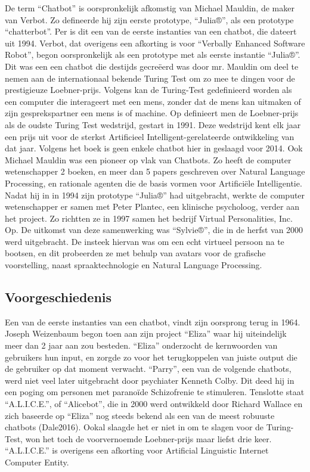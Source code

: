 De term “Chatbot” is oorspronkelijk afkomstig van Michael Mauldin, de maker van Verbot. Zo defineerde hij zijn eerste prototype, “Julia®”, als een prototype “chatterbot”. Per \textcite{Vlahos2019} is dit een van de eerste instanties van een chatbot, die dateert uit 1994. Verbot, dat overigens een afkorting is voor “Verbally Enhanced Software Robot”, begon oorspronkelijk als een prototype met als eerste instantie “Julia®”. Dit was een een chatbot die destijds gecreëerd was door mr. Mauldin om deel te nemen aan de internationaal bekende Turing Test om zo mee te dingen voor de prestigieuze Loebner-prijs. Volgens \textcite{Moor2012} kan de Turing-Test gedefinieerd worden als een computer die interageert met een mens, zonder dat de mens kan uitmaken of zijn gesprekspartner een mens is of machine. Op \textcite{O'Neill2016} definieert men de Loebner-prijs als de oudste Turing Test wedstrijd, gestart in 1991. Deze wedstrijd kent elk jaar een prijs uit voor de sterkst Artificieel Intelligent-gerelateerde ontwikkeling van dat jaar. Volgens het boek is geen enkele chatbot hier in geslaagd voor 2014. 
Ook Michael Mauldin was een pioneer op vlak van Chatbots. Zo heeft de computer wetenschapper 2 boeken, en meer dan 5 papers geschreven over Natural Language Processing, en rationale agenten die de basis vormen voor Artificiële Intelligentie. Nadat hij in in 1994 zijn prototype “Julia®” had uitgebracht, werkte de computer wetenschapper er samen met Peter Plantec, een klinische psycholoog, verder aan het project. Zo richtten ze in 1997 samen het bedrijf Virtual Personalities, Inc. Op. De uitkomst van deze samenwerking was “Sylvie®”, die in de herfst van 2000 werd uitgebracht. De insteek hiervan was om een echt virtueel persoon na te bootsen, en dit probeerden ze met behulp van avatars voor de grafische voorstelling, naast spraaktechnologie en Natural Language Processing. 

\subsection{Voorgeschiedenis}
Een van de eerste instanties van een chatbot, vindt zijn oorsprong terug in 1964. Joseph Weizenbaum \autocite{Weizenbaum1966} begon toen aan zijn project “Eliza” waar hij uiteindelijk meer dan 2 jaar aan zou besteden. “Eliza” onderzocht de kernwoorden van gebruikers hun input, en zorgde zo voor het terugkoppelen van juiste output die de gebruiker op dat moment verwacht. 
“Parry”, een van de volgende chatbots, werd niet veel later uitgebracht door psychiater Kenneth Colby. Dit deed hij in een poging om personen met paranoïde Schizofrenie te stimuleren. 
Tenslotte staat “A.L.I.C.E.”, of “Alicebot”, die in 2000 werd ontwikkeld door Richard Wallace en zich baseerde op “Eliza” nog steeds bekend als een van de meest robuuste chatbots (Dale2016). Ookal slaagde het er niet in om te slagen voor de Turing-Test, won het toch de voorvernoemde Loebner-prijs maar liefst drie keer. “A.L.I.C.E.” is overigens een afkorting voor Artificial Linguistic Internet Computer Entity. 


